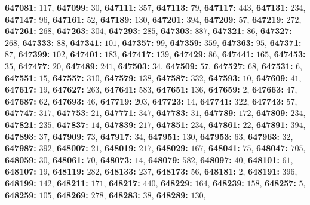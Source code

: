 \textsf{\bfseries 647081:} $117$, \textsf{\bfseries 647099:} $30$, \textsf{\bfseries 647111:} $357$, \textsf{\bfseries 647113:} $79$, \textsf{\bfseries 647117:} $443$, \textsf{\bfseries 647131:} $234$, \textsf{\bfseries 647147:} $96$, \textsf{\bfseries 647161:} $52$, \textsf{\bfseries 647189:} $130$, \textsf{\bfseries 647201:} $394$, \textsf{\bfseries 647209:} $57$, \textsf{\bfseries 647219:} $272$, \textsf{\bfseries 647261:} $268$, \textsf{\bfseries 647263:} $304$, \textsf{\bfseries 647293:} $285$, \textsf{\bfseries 647303:} $887$, \textsf{\bfseries 647321:} $86$, \textsf{\bfseries 647327:} $268$, \textsf{\bfseries 647333:} $88$, \textsf{\bfseries 647341:} $101$, \textsf{\bfseries 647357:} $99$, \textsf{\bfseries 647359:} $359$, \textsf{\bfseries 647363:} $95$, \textsf{\bfseries 647371:} $87$, \textsf{\bfseries 647399:} $102$, \textsf{\bfseries 647401:} $183$, \textsf{\bfseries 647417:} $139$, \textsf{\bfseries 647429:} $86$, \textsf{\bfseries 647441:} $165$, \textsf{\bfseries 647453:} $35$, \textsf{\bfseries 647477:} $20$, \textsf{\bfseries 647489:} $241$, \textsf{\bfseries 647503:} $34$, \textsf{\bfseries 647509:} $57$, \textsf{\bfseries 647527:} $68$, \textsf{\bfseries 647531:} $6$, \textsf{\bfseries 647551:} $15$, \textsf{\bfseries 647557:} $310$, \textsf{\bfseries 647579:} $138$, \textsf{\bfseries 647587:} $332$, \textsf{\bfseries 647593:} $10$, \textsf{\bfseries 647609:} $41$, \textsf{\bfseries 647617:} $19$, \textsf{\bfseries 647627:} $263$, \textsf{\bfseries 647641:} $583$, \textsf{\bfseries 647651:} $136$, \textsf{\bfseries 647659:} $2$, \textsf{\bfseries 647663:} $47$, \textsf{\bfseries 647687:} $62$, \textsf{\bfseries 647693:} $46$, \textsf{\bfseries 647719:} $203$, \textsf{\bfseries 647723:} $14$, \textsf{\bfseries 647741:} $322$, \textsf{\bfseries 647743:} $57$, \textsf{\bfseries 647747:} $317$, \textsf{\bfseries 647753:} $21$, \textsf{\bfseries 647771:} $347$, \textsf{\bfseries 647783:} $31$, \textsf{\bfseries 647789:} $172$, \textsf{\bfseries 647809:} $234$, \textsf{\bfseries 647821:} $235$, \textsf{\bfseries 647837:} $14$, \textsf{\bfseries 647839:} $217$, \textsf{\bfseries 647851:} $234$, \textsf{\bfseries 647861:} $22$, \textsf{\bfseries 647891:} $394$, \textsf{\bfseries 647893:} $37$, \textsf{\bfseries 647909:} $73$, \textsf{\bfseries 647917:} $34$, \textsf{\bfseries 647951:} $130$, \textsf{\bfseries 647953:} $63$, \textsf{\bfseries 647963:} $32$, \textsf{\bfseries 647987:} $392$, \textsf{\bfseries 648007:} $21$, \textsf{\bfseries 648019:} $217$, \textsf{\bfseries 648029:} $167$, \textsf{\bfseries 648041:} $75$, \textsf{\bfseries 648047:} $705$, \textsf{\bfseries 648059:} $30$, \textsf{\bfseries 648061:} $70$, \textsf{\bfseries 648073:} $14$, \textsf{\bfseries 648079:} $582$, \textsf{\bfseries 648097:} $40$, \textsf{\bfseries 648101:} $61$, \textsf{\bfseries 648107:} $19$, \textsf{\bfseries 648119:} $282$, \textsf{\bfseries 648133:} $237$, \textsf{\bfseries 648173:} $56$, \textsf{\bfseries 648181:} $2$, \textsf{\bfseries 648191:} $396$, \textsf{\bfseries 648199:} $142$, \textsf{\bfseries 648211:} $171$, \textsf{\bfseries 648217:} $440$, \textsf{\bfseries 648229:} $164$, \textsf{\bfseries 648239:} $158$, \textsf{\bfseries 648257:} $5$, \textsf{\bfseries 648259:} $105$, \textsf{\bfseries 648269:} $278$, \textsf{\bfseries 648283:} $38$, \textsf{\bfseries 648289:} $130$, 
